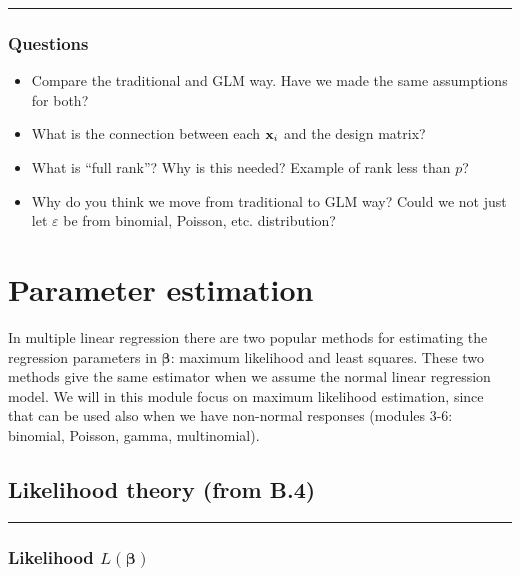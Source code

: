 \documentclass[
]{article}
\providecommand{\tightlist}{%
  \setlength{\itemsep}{0pt}\setlength{\parskip}{0pt}}
\begin{document}
\begin{center}\rule{0.5\linewidth}{0.5pt}\end{center}

\hypertarget{questions}{%
\subsubsection{Questions}\label{questions}}

\begin{itemize}
\tightlist
\item
  Compare the traditional and GLM way. Have we made the same assumptions
  for both?
\item
  What is the connection between each \({\bf x}_i\) and the design
  matrix?
\item
  What is ``full rank''? Why is this needed? Example of rank less than
  \(p\)?
\item
  Why do you think we move from traditional to GLM way? Could we not
  just let \(\varepsilon\) be from binomial, Poisson, etc. distribution?
\end{itemize}

\hypertarget{parameter-estimation}{%
\section{Parameter estimation}\label{parameter-estimation}}

In multiple linear regression there are two popular methods for
estimating the regression parameters in \(\boldsymbol{\beta}\): maximum
likelihood and least squares. These two methods give the same estimator
when we assume the normal linear regression model. We will in this
module focus on maximum likelihood estimation, since that can be used
also when we have non-normal responses (modules 3-6: binomial, Poisson,
gamma, multinomial).

\hypertarget{likelihood-theory-from-b.4}{%
\subsection{Likelihood theory (from
B.4)}\label{likelihood-theory-from-b.4}}

\begin{center}\rule{0.5\linewidth}{0.5pt}\end{center}

\hypertarget{likelihood-lboldsymbolbeta}{%
\subsubsection{\texorpdfstring{Likelihood
\(L(\boldsymbol{\beta})\)}{Likelihood L(\textbackslash boldsymbol\{\textbackslash beta\})}}\label{likelihood-lboldsymbolbeta}}
\end{document}
